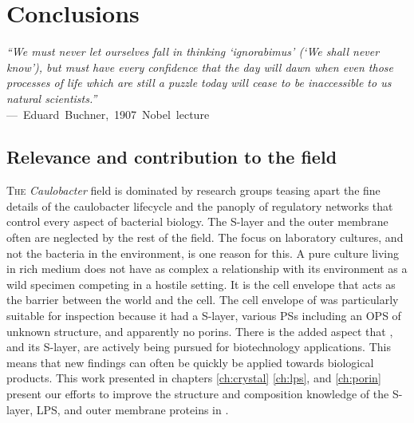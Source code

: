 
\acresetall
\resetlinenumber[1]
\chapter{Conclusions}
\label{ch:conclusions}
\begin{epigraph}
  \emph{``We must never let ourselves fall in thinking `ignorabimus' (`We shall never know'), but must have every confidence that the day will dawn when even those processes of life which are still a puzzle today will cease to be inaccessible to us natural scientists.''}\\ ---~Eduard~Buchner,~1907~Nobel~lecture 
\end{epigraph}
\section{Relevance and contribution to the field}\label{sec:relev-contr-field} 

\lettrine[lines=2]{T}{he} \textit{Caulobacter} field is dominated by research groups teasing apart the fine details of the \acl{caulobacter} lifecycle and the panoply of regulatory networks that control every aspect of bacterial biology. The \ac{S-layer}
 and the outer membrane often are neglected by the rest of the field. The focus
 on laboratory cultures, and not the bacteria in the environment, is one reason
 for this. A pure culture living in rich medium does not have as complex a
 relationship with its environment as a wild specimen competing in a hostile
 setting. It is the cell envelope that acts as the barrier between the world and
 the cell.  The cell envelope of \caulobacter{} was particularly suitable for inspection because it had a \acl{S-layer}, various \aclp{PS} including an \ac{OPS} of unknown structure, and apparently no porins. There is the added aspect that \caulobacter{}, and its \ac{S-layer}, are actively being pursued for biotechnology applications. This means that new findings can often be quickly be applied towards biological products. This work presented in chapters \ref{ch:crystal} \ref{ch:lps}, and \ref{ch:porin} present our efforts to improve the structure and composition knowledge of the \ac{S-layer}, \ac{LPS}, and outer membrane proteins in \caulobacter{}.
 
